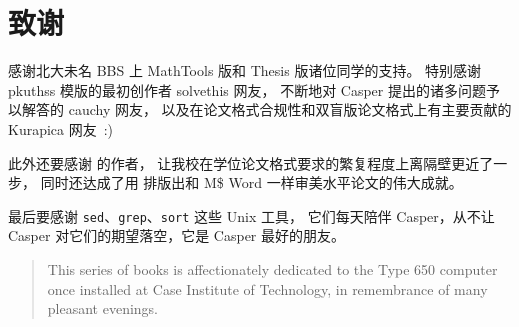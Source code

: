 %
%
%
%

\chapter{致谢}

感谢北大未名 BBS 上 MathTools 版和 Thesis 版诸位同学的支持。
特别感谢 pkuthss 模版的最初创作者 solvethis 网友，
不断地对 Casper 提出的诸多问题予以解答的 cauchy 网友，
以及在论文格式合规性和双盲版论文格式上有主要贡献的 Kurapica 网友~:)

此外还要感谢 \parencite{pku-thesisstyle, pku-degreetype} 的作者，
让我校在学位论文格式要求的繁复程度上离隔壁更近了一步，
同时还达成了用  排版出和 M\$ Word 一样审美水平论文的伟大成就。

最后要感谢 \verb|sed|、\verb|grep|、\verb|sort| 这些 Unix 工具，
它们每天陪伴 Casper，从不让 Casper 对它们的期望落空，它是 Casper 最好的朋友。

\vspace{1em}
\begin{quotation}
\small This series of books is affectionately dedicated to the
Type 650 computer once installed at Case Institute of Technology,
in remembrance of many pleasant evenings.

\end{quotation}

